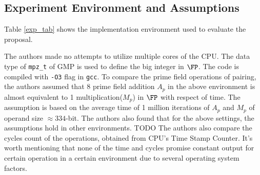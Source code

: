 \subsection{Experiment Environment and Assumptions}
Table \ref{exp_tab} shows the implementation environment used to evaluate the proposal.  
\renewcommand{\baselinestretch}{1.5}
\begin{table}[!h]
	\centering
	\fontsize{9pt}{9pt}\selectfont
	\caption{Computational Environment}
	\label{exp_tab}
\end{table}
\renewcommand{\baselinestretch}{1.0}

The authors made no attempts to utilize multiple cores of the CPU.
The data type of \verb|mpz_t| of GMP is used to define the big integer in $\FP$.
The code is compiled with \verb|-O3| flag in \verb|gcc|.
To compare the prime field operations of pairing, the authors assumed that 8 prime field addition $A_p$ in the above environment is almost equivalent to 1 multiplication($M_p$) in $\FP$ with respect of time.
The assumption is based on the average time of 1 million iterations of $A_p$ and $M_p$ of operand size $\approx 334$-bit. 
The authors also found that for the above settings, the assumptions hold in other environments.
TODO %
The authors also compare the cycles count of the operations, obtained from CPU's  Time Stamp Counter.
It's worth mentioning that none of the time and cycles promise constant output for certain operation in a certain environment due to several operating system factors. 
 
